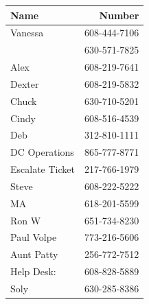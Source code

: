 \documentclass[12pt,twoside]{article}
\begin{document}
\begin{center}
\begin{tabular}{lr}
\hline
\textbf{Name} & \textbf{Number}\\
\hline
Vanessa & 608-444-7106\\
 & 630-571-7825\\
Alex & 608-219-7641\\
Dexter & 608-219-5832\\
Chuck & 630-710-5201\\
Cindy & 608-516-4539\\
Deb & 312-810-1111\\
DC Operations & 865-777-8771\\
Escalate Ticket & 217-766-1979\\
Steve & 608-222-5222\\
MA & 618-201-5599\\
Ron W & 651-734-8230\\
Paul Volpe & 773-216-5606\\
Aunt Patty & 256-772-7512\\
Help Desk: & 608-828-5889\\
Soly & 630-285-8386\\
\hline
\end{tabular}
\end{center}
\end{document}
